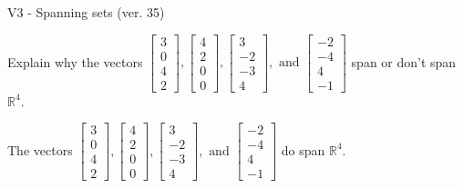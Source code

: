 \begin{exercise}
  \begin{exerciseTitle}V3 - Spanning sets (ver. 35)\end{exerciseTitle}
  \begin{exerciseStatement}
    Explain why the vectors \(\left[\begin{array}{r}
3 \\
0 \\
4 \\
2
\end{array}\right] , \left[\begin{array}{r}
4 \\
2 \\
0 \\
0
\end{array}\right] , \left[\begin{array}{r}
3 \\
-2 \\
-3 \\
4
\end{array}\right] , \text{ and } \left[\begin{array}{r}
-2 \\
-4 \\
4 \\
-1
\end{array}\right]\) span or don't span \(\mathbb{R}^4\). 
	


  \end{exerciseStatement}
  \begin{exerciseAnswer}
   The vectors \(\left[\begin{array}{r}
3 \\
0 \\
4 \\
2
\end{array}\right] , \left[\begin{array}{r}
4 \\
2 \\
0 \\
0
\end{array}\right] , \left[\begin{array}{r}
3 \\
-2 \\
-3 \\
4
\end{array}\right] , \text{ and } \left[\begin{array}{r}
-2 \\
-4 \\
4 \\
-1
\end{array}\right]\) 
  	 do  
	span \(\mathbb{R}^4\).
  


  \end{exerciseAnswer}
\end{exercise}